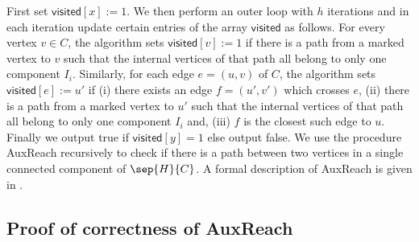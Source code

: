 \documentclass{toc}
\begin{document}
First set $\textsf{visited}[x]:=1$. We then perform an outer loop with $h$ iterations and in each iteration update certain entries of the array $\textsf{visited}$ as follows. For every vertex $v \in C$, the algorithm sets $\textsf{visited}[v]:=1$ if there is a path from a marked vertex to $v$ such that the internal vertices of that path all belong to only one component $I_i$. Similarly, for each edge $e = (u,v)$ of $C$, the algorithm sets $\textsf{visited}[e]:=u'$ if (i) there exists an edge $f = (u',v')$ which crosses $e$, (ii) there is a path from a marked vertex to $u'$ such that the internal vertices of that path all belong to only one component $I_i$ and, (iii) $f$ is the closest such edge to $u$. Finally we output \textsf{true} if $\textsf{visited}[y] = 1$ else output \textsf{false}. We use the procedure \textsf{AuxReach} recursively to check if there is a path between two vertices in a single connected component of $\sep{H}{C}$. A formal description of \textsf{AuxReach} is given in .
\subsection{Proof of correctness of \textsf{AuxReach}}
\end{document}

